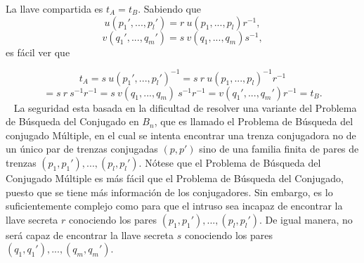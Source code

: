 \documentclass[12pt]{book}
\theoremstyle{definition}
\begin{document}
La llave compartida es $t_A = t_B$. Sabiendo que 
$$u(p_1',...,p_l')=r\ u(p_1,...,p_l)r^{-1},$$
$$v(q_1',...,q_m')=s\ v(q_1,...,q_m)s^{-1},$$
es fácil ver que

$$t_A = s\ u(p_1',...,p_l')^{-1} = s\ r\ u(p_1,...,p_l)^{-1}r^{-1}$$
$$=s\ r\ s^{-1}r^{-1}= s\ v(q_1,...,q_m)\ s^{-1}r^{-1}=v(q_1',...,q_m')r^{-1} = t_B.$$
\
\newline
La seguridad esta basada en la dificultad de resolver una variante del Problema de Búsqueda del Conjugado en $B_n$, que es llamado el Problema de Búsqueda del conjugado Múltiple, en el cual se intenta encontrar una trenza conjugadora no de un único par de trenzas conjugadas $(p,p')$ sino de una familia finita de pares de trenzas $(p_1,p_1'),...,(p_l,p_l')$. Nótese que el Problema de Búsqueda del Conjugado Múltiple es más fácil que el Problema de Búsqueda del Conjugado, puesto que se tiene más información de los conjugadores. Sin embargo, es lo suficientemente complejo como para que el intruso sea incapaz de encontrar la llave secreta $r$ conociendo los pares $(p_1,p_1'),...,(p_l,p_l')$. De igual manera, no será capaz de encontrar la llave secreta $s$ conociendo los pares $(q_1,q_1'),...,(q_m,q_m')$.
\end{document}
